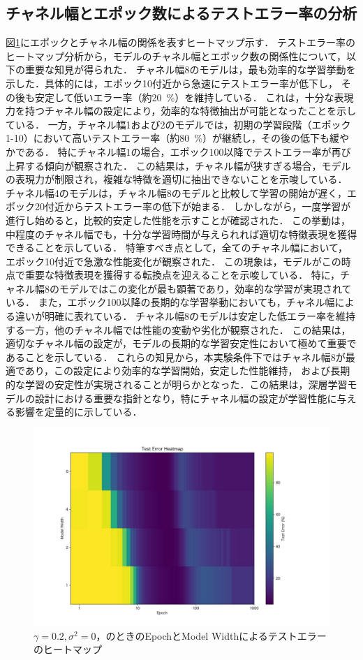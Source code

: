 \subsection{チャネル幅とエポック数によるテストエラー率の分析}
図\ref{fig:modelwidth_heatmap}にエポックとチャネル幅の関係を表すヒートマップ示す．
テストエラー率のヒートマップ分析から，モデルのチャネル幅とエポック数の関係性について，以下の重要な知見が得られた．
チャネル幅8のモデルは，最も効率的な学習挙動を示した．具体的には，エポック10付近から急速にテストエラー率が低下し，
その後も安定して低いエラー率（約\SI{20}{\percent}）を維持している．
これは，十分な表現力を持つチャネル幅の設定により，効率的な特徴抽出が可能となったことを示している．
一方，チャネル幅1および2のモデルでは，初期の学習段階（エポック1-10）において高いテストエラー率（約\SI{80}{\percent}）が継続し，その後の低下も緩やかである．
特にチャネル幅1の場合，エポック100以降でテストエラー率が再び上昇する傾向が観察された．
この結果は，チャネル幅が狭すぎる場合，モデルの表現力が制限され，複雑な特徴を適切に抽出できないことを示唆している．
チャネル幅4のモデルは，チャネル幅8のモデルと比較して学習の開始が遅く，エポック20付近からテストエラー率の低下が始まる．
しかしながら，一度学習が進行し始めると，比較的安定した性能を示すことが確認された．
この挙動は，中程度のチャネル幅でも，十分な学習時間が与えられれば適切な特徴表現を獲得できることを示している．
特筆すべき点として，全てのチャネル幅において，エポック10付近で急激な性能変化が観察された．
この現象は，モデルがこの時点で重要な特徴表現を獲得する転換点を迎えることを示唆している．
特に，チャネル幅8のモデルではこの変化が最も顕著であり，効率的な学習が実現されている．
また，エポック100以降の長期的な学習挙動においても，チャネル幅による違いが明確に表れている．
チャネル幅8のモデルは安定した低エラー率を維持する一方，他のチャネル幅では性能の変動や劣化が観察された．
この結果は，適切なチャネル幅の設定が，モデルの長期的な学習安定性において極めて重要であることを示している．
これらの知見から，本実験条件下ではチャネル幅8が最適であり，この設定により効率的な学習開始，安定した性能維持，
および長期的な学習の安定性が実現されることが明らかとなった．この結果は，深層学習モデルの設計における重要な指針となり，特にチャネル幅の設定が学習性能に与える影響を定量的に示している．

\begin{figure}[H]
    \centering
    \includegraphics[width=\linewidth]{fig/test_error_heatmap_ln0.2.pdf}
    \caption{$\gamma = 0.2, \sigma^2 = 0$，のときのEpochとModel Widthによるテストエラーのヒートマップ}
    \label{fig:modelwidth_heatmap}
\end{figure}
